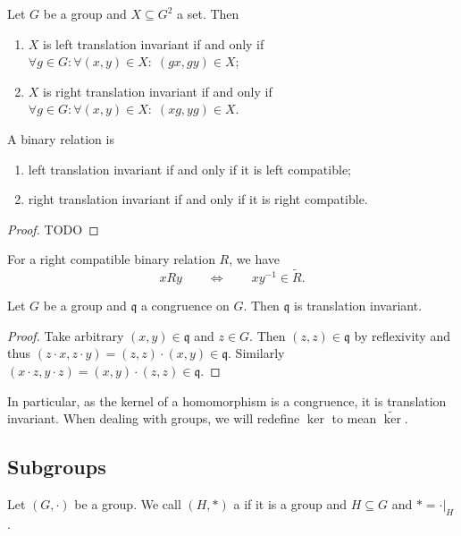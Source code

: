\begin{lemma}
Let $G$ be a group and $X\subseteq G^2$ a set. Then
\begin{enumerate}
\item $X$ is left translation invariant \textup{if and only if} $\forall g\in G: \forall (x,y)\in X: \; (gx, gy)\in X$;
\item $X$ is right translation invariant \textup{if and only if} $\forall g\in G: \forall (x,y)\in X: \; (xg, yg)\in X$.
\end{enumerate}
\end{lemma}

\begin{lemma}
A binary relation is
\begin{enumerate}
\item left translation invariant \textup{if and only if} it is left compatible;
\item right translation invariant \textup{if and only if} it is right compatible.
\end{enumerate}
\end{lemma}
\begin{proof}
TODO
\end{proof}

For a right compatible binary relation $R$, we have
\[ xRy \qquad\iff\qquad xy^{-1} \in \widetilde{R}. \]

\begin{proposition} \label{congruenceTranslationInvariant}
Let $G$ be a group and $\mathfrak{q}$ a congruence on $G$. Then $\mathfrak{q}$ is translation invariant. 
\end{proposition}
\begin{proof}
Take arbitrary $(x,y)\in\mathfrak{q}$ and $z\in G$. Then $(z,z)\in\mathfrak{q}$ by reflexivity and thus $(z\cdot x, z\cdot y) = (z,z)\cdot (x,y)\in\mathfrak{q}$. Similarly $(x\cdot z, y\cdot z) = (x,y)\cdot (z,z)\in\mathfrak{q}$.
\end{proof}

In particular, as the kernel of a homomorphism is a congruence, it is translation invariant.
When dealing with groups, we will redefine $\ker$ to mean $\widetilde{\ker}$.

\subsection{Subgroups}
\begin{definition}
Let $(G,\boldsymbol{\cdot})$ be a group. We call $(H,*)$ a  if it is a group and $H\subseteq G$ and $* = \boldsymbol{\cdot}|_H$.
\end{definition}


